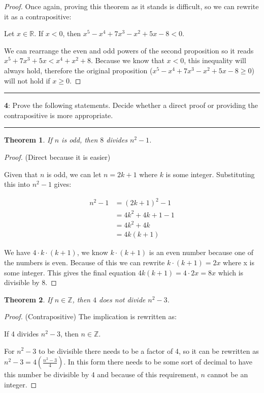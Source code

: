 \documentclass[11pt]{article}
\newtheorem{theorem}{Theorem}
\newcommand\question[2]{\vspace{.25in}\hrule\textbf{#1}: #2\vspace{.5em}\hrule\vspace{.10in}}
\newcommand{\R}{\mathbb{R}}
\newcommand{\Z}{\mathbb{Z}}
\begin{document}
\begin{proof}
	Once again, proving this theorem as it stands is difficult, so we can rewrite it as a contrapositive:

	Let $x \in \R$. If $x < 0$, then $x^5-x^4+7x^3-x^2+5x-8 < 0$.

	We can rearrange the even and odd powers of the second proposition so it reads $x^5 +7x^3+5x < x^4 +x^2+8$. Because we know that $x < 0$, this inequality will always hold, therefore the original proposition ($x^5-x^4+7x^3-x^2+5x-8 \ge 0$) will not hold if $x \ge 0$.
\end{proof}

\newpage

\question{4}{Prove the following statements. Decide whether a direct proof or providing the contrapositive is more appropriate.}

\begin{theorem}
	If $n$ is odd, then $8$ divides $n^2-1$.
\end{theorem}

\begin{proof}
	(Direct because it is easier)

	Given that $n$ is odd, we can let $n=2k+1$ where $k$ is some integer. Substituting this into $n^2-1$ gives:

	\begin{align*}
		n^2-1 &= (2k+1)^2 - 1\\
		&= 4k^2 + 4k +1 - 1\\
		&= 4k^2 + 4k\\
		&= 4k(k+1)
	\end{align*}

	We have $4 \cdot k \cdot (k+1)$, we know $k \cdot (k+1)$ is an even number because one of the numbers is even. Because of this we can rewrite $k \cdot (k+1) = 2x$ where x is some integer. This gives the final equation $4k(k+1) = 4 \cdot 2x = 8x$ which is divisible by 8.
\end{proof}

\begin{theorem}
	If $n \in \Z$, then $4$ does not divide $n^2-3$.
\end{theorem}

\begin{proof}
	(Contrapositive) The implication is rewritten as:

	If 4 divides $n^2-3$, then $n \in \Z$.

	For $n^2-3$ to be divisible there needs to be a factor of 4, so it can be rewritten as $n^2-3 = 4(\frac{n^2-3}{4})$. In this form there needs to be some sort of decimal to have this number be divisible by 4 and because of this requirement, $n$ cannot be an integer.
\end{proof}






	
\end{document}
